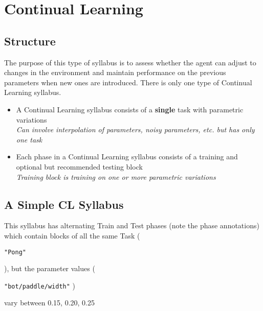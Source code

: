 \section{Continual Learning}
\subsection*{Structure}

The purpose of this type of syllabus is to assess whether the agent can adjust to changes in the environment and maintain performance on the previous parameters when new ones are introduced. There is only one type of Continual Learning syllabus.

\begin{itemize}
\item A Continual Learning syllabus consists of a \textbf{single} task with parametric variations\\
\textit{Can involve interpolation of parameters, noisy parameters, etc. but has only one task \\}


\item Each phase in a Continual Learning syllabus consists of a training and optional but recommended testing block\\
\textit{Training block is training on one or more parametric variations}\\[0.1in]
\end{itemize}

\subsection*{A Simple CL Syllabus}

This syllabus has alternating Train and Test phases (note the phase annotations) which contain blocks of all the same Task (
\begin{small}
\verb|"Pong"|
\end{small}), but the parameter values (
\begin{small}
\verb|"bot/paddle/width"| )
\end{small}vary between 0.15, 0.20, 0.25

